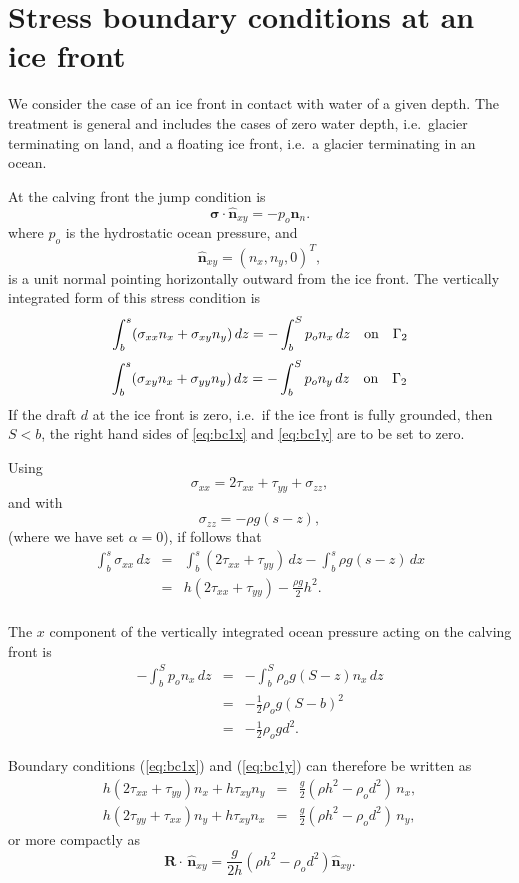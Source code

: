 \documentclass[10pt,a4paper]{book}
\newcommand{\txx}{\tau_{xx}}
\newcommand{\tyy}{\tau_{yy}}
\newcommand{\txy}{\tau_{xy}}
\newcommand{\sxx}{\sigma_{xx}}
\newcommand{\sxy}{\sigma_{xy}}
\newcommand{\syy}{\sigma_{yy}}
\newcommand{\szz}{\sigma_{zz}}
\newcommand{\normal}{\hat{\bm{n}}}
\begin{document}
\section{Stress boundary conditions at an ice front}

We consider the case of an ice front in contact with water of a given
depth. The treatment is general and includes the cases of zero water
depth, i.e.\ glacier terminating on land, and a floating ice front,
i.e.\ a glacier terminating in an ocean.


\label{sec:bccalving}
At the calving front the jump condition is
\[\bm{\sigma} \cdot \normal_{xy}= -p_o \normal_n .\]
where $p_o$ is the hydrostatic ocean pressure, and
\[
\normal_{xy}=(n_x,n_y,0)^T ,
\] 
is a unit normal pointing horizontally
outward from the ice front.  The vertically integrated form of this stress condition  is
\begin{equation}
 \int_b^s ( \sxx n_x + \sxy n_y) \, dz = -\int_b^S  p_o n_x \, dz  \quad \hbox{on} \quad \Gamma_2 
\label{eq:bc1x}
\end{equation}
\begin{equation} \int_b^s (\sxy n_x + \syy n_y) \, dz = -\int_b^S p_o n_y \, dz \quad \hbox{on} \quad \Gamma_2 
\label{eq:bc1y}
\end{equation}
If the draft $d$ at the ice front is zero,
i.e.\ if the ice front is fully grounded, then $S<b$, the right hand
sides of \eqref{eq:bc1x} and \eqref{eq:bc1y} are to be set to zero.

Using
\[ \sxx=2 \txx +\tyy + \szz ,\]
and with
\[ \szz=-\rho g (s-z) ,\]
(where we have set $\alpha=0$), if follows that
\begin{eqnarray*}
\int_b^s \sxx \, dz &=& \int_b^s (2 \txx + \tyy) \, dz - \int_b^s \rho g (s-z) \, dx \nonumber \\
                    &=& h (2 \txx + \tyy)  - \frac{\rho g}{2} h^2 . \nonumber \\
\end{eqnarray*}

The $x$ component of the vertically integrated ocean pressure acting on the calving front is
\begin{eqnarray*}
-\int_b^S  p_o n_x \, dz &=& -\int_b^S  \rho_o g (S-z) n_x \, dz \\
&=& -\frac{1}{2} \rho_o g (S-b)^2 \\
&=& -\frac{1}{2} \rho_o g d^2 .
\end{eqnarray*}

Boundary conditions (\ref{eq:bc1x}) and (\ref{eq:bc1y}) can therefore be written as
\begin{eqnarray}
h (2 \txx + \tyy) n_x + h \txy n_y &=&  \frac{g}{2} (\rho h^2 - \rho_o  d^2)\, n_x ,\label{eq:bcgfx} \\
h (2 \tyy + \txx) n_y + h \txy n_x &=&  \frac{g}{2} (\rho h^2 - \rho_o  d^2)\, n_y ,\label{eq:bcgfy}
\end{eqnarray}
or more compactly as
\begin{equation}
\bm{R} \cdot \, \normal_{xy}=\frac{g}{2h} ( \rho h^2-\rho_o d^2) \normal_{xy} .
\label{eq:BCCF}
\end{equation}
\end{document}
